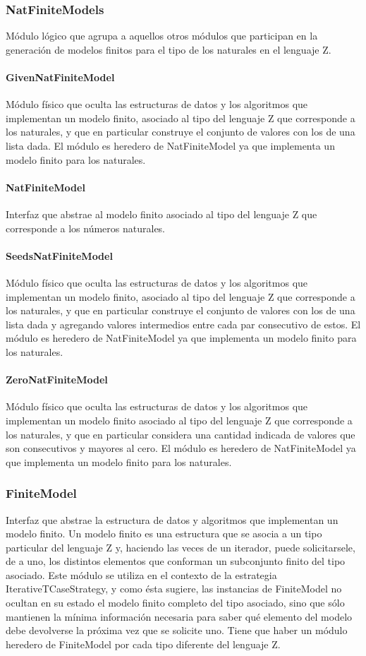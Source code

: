 \documentclass[a4paper,10pt]{report}
\begin{document}
			\subsubsection{NatFiniteModels}
			Módulo lógico que agrupa a aquellos otros módulos que participan en la generación de modelos finitos para el tipo de los naturales en el lenguaje Z.
				\paragraph{GivenNatFiniteModel}
				Módulo físico que oculta las estructuras de datos y los algoritmos que implementan un modelo finito, asociado al tipo del lenguaje Z que corresponde a los naturales, y que en particular construye el conjunto de valores con los de una lista dada. El módulo es heredero de NatFiniteModel ya que implementa un modelo finito para los naturales.
				\paragraph{NatFiniteModel}
				Interfaz que abstrae al modelo finito asociado al tipo del lenguaje Z que corresponde a los números naturales. 
				\paragraph{SeedsNatFiniteModel}
				Módulo físico que oculta las estructuras de datos y los algoritmos que implementan un modelo finito, asociado al tipo del lenguaje Z que corresponde a los naturales, y que en particular construye el conjunto de valores con los de una lista dada y agregando valores intermedios entre cada par consecutivo de estos. El módulo es heredero de NatFiniteModel ya que implementa un modelo finito para los naturales.
				\paragraph{ZeroNatFiniteModel}
				Módulo físico que oculta las estructuras de datos y los algoritmos que implementan un modelo finito asociado al tipo del lenguaje Z que corresponde a los naturales, y que en particular considera una cantidad indicada de valores que son consecutivos y mayores al cero. El módulo es heredero de NatFiniteModel ya que implementa un modelo finito para los naturales.
			\subsubsection{FiniteModel}
			Interfaz que abstrae la estructura de datos y algoritmos que implementan un modelo finito. Un modelo finito es una estructura que se asocia a un tipo particular del lenguaje Z y, haciendo las veces de un iterador, puede solicitarsele, de a uno, los distintos elementos que conforman un subconjunto finito del tipo asociado. Este módulo se utiliza en el contexto de la estrategia IterativeTCaseStrategy, y como ésta sugiere, las instancias de FiniteModel no ocultan en su estado el modelo finito completo del tipo asociado, sino que sólo mantienen la mínima información necesaria para saber qué elemento del modelo debe devolverse la próxima vez que se solicite uno.
			Tiene que haber un módulo heredero de FiniteModel por cada tipo diferente del lenguaje Z.
\end{document}
